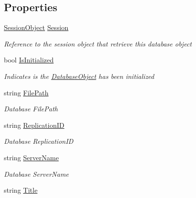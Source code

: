 \subsection*{Properties}
\begin{DoxyCompactItemize}
\item 
\hyperlink{class_session_object}{Session\+Object} \hyperlink{class_database_object_aa8484162b7d2a7c4c9426bca13c64c07}{Session}
\begin{DoxyCompactList}\small\item\em Reference to the session object that retrieve this database object \end{DoxyCompactList}\item 
bool \hyperlink{class_database_object_a5fe036d32a30eb10d1b3f6a30263f740}{Is\+Initialized}
\begin{DoxyCompactList}\small\item\em Indicates is the \hyperlink{class_database_object}{Database\+Object} has been initialized \end{DoxyCompactList}\item 
string \hyperlink{class_database_object_a38a1a78430c6cd1fc4eef054e39145ce}{File\+Path}
\begin{DoxyCompactList}\small\item\em Database File\+Path \end{DoxyCompactList}\item 
string \hyperlink{class_database_object_aaa091ee1a9a86d2d10fe2381ee2d1f4c}{Replication\+ID}
\begin{DoxyCompactList}\small\item\em Database Replication\+ID \end{DoxyCompactList}\item 
string \hyperlink{class_database_object_ad6bfcd30152f7a115ac5a1c7fbfa9fcb}{Server\+Name}
\begin{DoxyCompactList}\small\item\em Database Server\+Name \end{DoxyCompactList}\item 
string \hyperlink{class_database_object_a9af3f75274dd39f7fa82a355dc4ddf39}{Title}

\end{DoxyCompactItemize}
